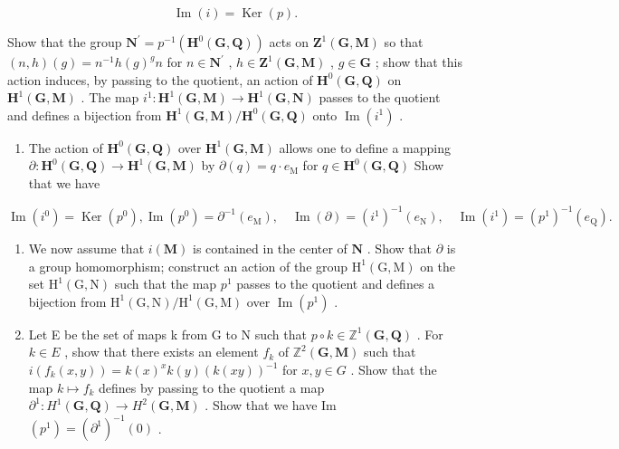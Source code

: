 \[
\operatorname{Im} (i) = \operatorname{Ker} (p).
\]

Show that the group \(\mathbf{N}^{\prime}=p^{-1}(\mathbf{H}^{0}(\mathbf{G},\mathbf{Q}))\) acts on \(\mathbf{Z}^{1}(\mathbf{G},\mathbf{M})\) so that \((n,h)(g)=n^{-1}h(g)^{g}n\) for \(n\in\mathbf{N}^{\prime}\) , \(h\in\mathbf{Z}^{1}(\mathbf{G},\mathbf{M})\) , \(g\in\mathbf{G}\) ; show that this action induces, by passing to the quotient, an action of \(\mathbf{H}^{0}(\mathbf{G},\mathbf{Q})\) on \(\mathbf{H}^{1}(\mathbf{G},\mathbf{M})\) . The map \(i^{1}:\mathbf{H}^{1}(\mathbf{G},\mathbf{M})\to\mathbf{H}^{1}(\mathbf{G},\mathbf{N})\) passes to the quotient and defines a bijection from \(\mathbf{H}^{1}(\mathbf{G},\mathbf{M})/\mathbf{H}^{0}(\mathbf{G},\mathbf{Q})\) onto \(\operatorname{Im}(i^{1})\) .

\begin{enumerate}
\def\labelenumi{\alph{enumi})}
\setcounter{enumi}{3}
\tightlist
\item
  The action of \(\mathbf{H}^0 (\mathbf{G},\mathbf{Q})\) over \(\mathbf{H}^{1}(\mathbf{G},\mathbf{M})\) allows one to define a mapping \(\partial :\mathbf{H}^{0}(\mathbf{G},\mathbf{Q})\to \mathbf{H}^{1}(\mathbf{G},\mathbf{M})\) by \(\partial (q) = q\cdot e_{\mathrm{M}}\) for \(q\in \mathbf{H}^0 (\mathbf{G},\mathbf{Q})\) Show that we have
\end{enumerate}

\[
\operatorname{Im} \left(i ^ {0}\right) = \operatorname{Ker} \left(p ^ {0}\right), \operatorname{Im} \left(p ^ {0}\right) = \partial^ {- 1} (e _ {\mathrm{M}}), \quad \operatorname{Im} (\partial) = (i ^ {1}) ^ {- 1} \left(e _ {\mathrm{N}}\right), \quad \operatorname{Im} \left(i ^ {1}\right) = (p ^ {1}) ^ {- 1} \left(e _ {\mathrm{Q}}\right).
\]

\begin{enumerate}
\def\labelenumi{\alph{enumi})}
\setcounter{enumi}{4}
\item
  We now assume that \(i(\mathbf{M})\) is contained in the center of \(\mathbf{N}\) . Show that \(\partial\) is a group homomorphism; construct an action of the group \(\mathrm{H}^{1}(\mathrm{G},\mathrm{M})\) on the set \(\mathrm{H}^{1}(\mathrm{G},\mathrm{N})\) such that the map \(p^1\) passes to the quotient and defines a bijection from \(\mathrm{H}^{1}(\mathrm{G},\mathrm{N}) / \mathrm{H}^{1}(\mathrm{G},\mathrm{M})\) over \(\operatorname{Im}(p^1)\) .
\item
  Let E be the set of maps k from G to N such that \(p \circ k \in \mathbb{Z}^{1}(\mathbf{G}, \mathbf{Q})\) . For \(k \in E\) , show that there exists an element \(f_{k}\) of \(\mathbb{Z}^{2}(\mathbf{G}, \mathbf{M})\) such that \(i(f_{k}(x, y)) = k(x)^{x} k(y)(k(xy))^{-1}\) for \(x, y \in G\) . Show that the map \(k \mapsto f_{k}\) defines by passing to the quotient a map \(\partial^{1}: H^{1}(\mathbf{G}, \mathbf{Q}) \to H^{2}(\mathbf{G}, \mathbf{M})\) . Show that we have Im \((p^{1}) = (\partial^{1})^{-1}(0)\) .
\end{enumerate}

